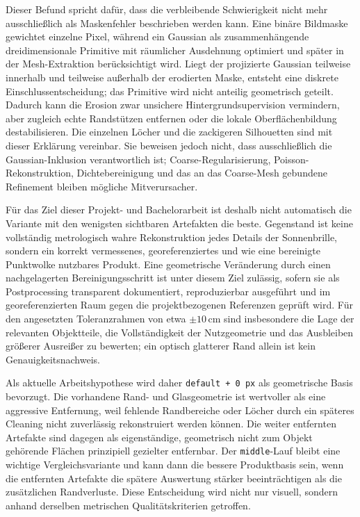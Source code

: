 \documentclass[12pt,a4paper]{article}
\begin{document}
Dieser Befund spricht dafür, dass die verbleibende Schwierigkeit nicht mehr ausschließlich als Maskenfehler beschrieben werden kann. Eine binäre Bildmaske gewichtet einzelne Pixel, während ein Gaussian als zusammenhängende dreidimensionale Primitive mit räumlicher Ausdehnung optimiert und später in der Mesh-Extraktion berücksichtigt wird. Liegt der projizierte Gaussian teilweise innerhalb und teilweise außerhalb der erodierten Maske, entsteht eine diskrete Einschlussentscheidung; das Primitive wird nicht anteilig geometrisch geteilt. Dadurch kann die Erosion zwar unsichere Hintergrundsupervision vermindern, aber zugleich echte Randstützen entfernen oder die lokale Oberflächenbildung destabilisieren. Die einzelnen Löcher und die zackigeren Silhouetten sind mit dieser Erklärung vereinbar. Sie beweisen jedoch nicht, dass ausschließlich die Gaussian-Inklusion verantwortlich ist; Coarse-Regularisierung, Poisson-Rekonstruktion, Dichtebereinigung und das an das Coarse-Mesh gebundene Refinement bleiben mögliche Mitverursacher.

Für das Ziel dieser Projekt- und Bachelorarbeit ist deshalb nicht automatisch die Variante mit den wenigsten sichtbaren Artefakten die beste. Gegenstand ist keine vollständig metrologisch wahre Rekonstruktion jedes Details der Sonnenbrille, sondern ein korrekt vermessenes, georeferenziertes und wie eine bereinigte Punktwolke nutzbares Produkt. Eine geometrische Veränderung durch einen nachgelagerten Bereinigungsschritt ist unter diesem Ziel zulässig, sofern sie als Postprocessing transparent dokumentiert, reproduzierbar ausgeführt und im georeferenzierten Raum gegen die projektbezogenen Referenzen geprüft wird. Für den angesetzten Toleranzrahmen von etwa $\pm 10\,\mathrm{cm}$ sind insbesondere die Lage der relevanten Objektteile, die Vollständigkeit der Nutzgeometrie und das Ausbleiben größerer Ausreißer zu bewerten; ein optisch glatterer Rand allein ist kein Genauigkeitsnachweis.

Als aktuelle Arbeitshypothese wird daher \texttt{default + 0\,px} als geometrische Basis bevorzugt. Die vorhandene Rand- und Glasgeometrie ist wertvoller als eine aggressive Entfernung, weil fehlende Randbereiche oder Löcher durch ein späteres Cleaning nicht zuverlässig rekonstruiert werden können. Die weiter entfernten Artefakte sind dagegen als eigenständige, geometrisch nicht zum Objekt gehörende Flächen prinzipiell gezielter entfernbar. Der \texttt{middle}-Lauf bleibt eine wichtige Vergleichsvariante und kann dann die bessere Produktbasis sein, wenn die entfernten Artefakte die spätere Auswertung stärker beeinträchtigen als die zusätzlichen Randverluste. Diese Entscheidung wird nicht nur visuell, sondern anhand derselben metrischen Qualitätskriterien getroffen.
\end{document}
